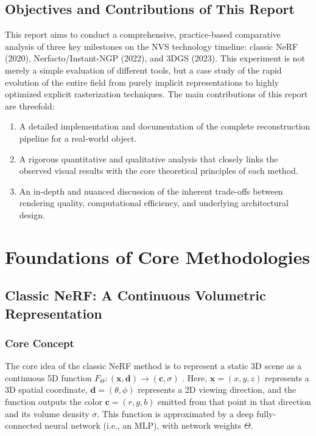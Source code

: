 \documentclass[11pt]{article}
\begin{document}
\subsection{Objectives and Contributions of This Report}
This report aims to conduct a comprehensive, practice-based comparative analysis of three key milestones on the NVS technology timeline: classic NeRF (2020), Nerfacto/Instant-NGP (2022), and 3DGS (2023). This experiment is not merely a simple evaluation of different tools, but a case study of the rapid evolution of the entire field from purely implicit representations to highly optimized explicit rasterization techniques. The main contributions of this report are threefold:
\begin{enumerate}
    \item A detailed implementation and documentation of the complete reconstruction pipeline for a real-world object.
    \item A rigorous quantitative and qualitative analysis that closely links the observed visual results with the core theoretical principles of each method.
    \item An in-depth and nuanced discussion of the inherent trade-offs between rendering quality, computational efficiency, and underlying architectural design.
\end{enumerate}

\section{Foundations of Core Methodologies}

\subsection{Classic NeRF: A Continuous Volumetric Representation}

\subsubsection{Core Concept}
The core idea of the classic NeRF method is to represent a static 3D scene as a continuous 5D function $F_{\Theta}:(\mathbf{x}, \mathbf{d}) \rightarrow (\mathbf{c}, \sigma)$ \cite{mildenhall2020nerf}. Here, $\mathbf{x}=(x,y,z)$ represents a 3D spatial coordinate, $\mathbf{d}=(\theta,\phi)$ represents a 2D viewing direction, and the function outputs the color $\mathbf{c}=(r,g,b)$ emitted from that point in that direction and its volume density $\sigma$. This function is approximated by a deep fully-connected neural network (i.e., an MLP), with network weights $\Theta$.
\end{document}
